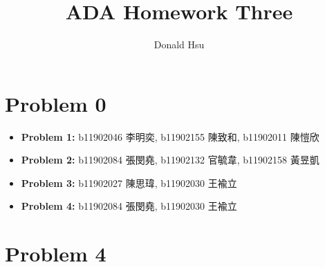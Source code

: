\documentclass{homework}
\author{Donald Hsu}
\title{ADA Homework Three}
\begin{document}
\maketitle
\section*{Problem 0}
\begin{itemize}
    \item \textbf{Problem 1:} b11902046 李明奕, b11902155 陳致和, b11902011 陳愷欣
    \item \textbf{Problem 2:} b11902084 張閔堯, b11902132 官毓韋, b11902158 黃昱凱
    \item \textbf{Problem 3:} b11902027 陳思瑋, b11902030 王褕立
    \item \textbf{Problem 4:} b11902084 張閔堯, b11902030 王褕立
\end{itemize}
\clearpage

\section*{Problem 4}
\end{document}
